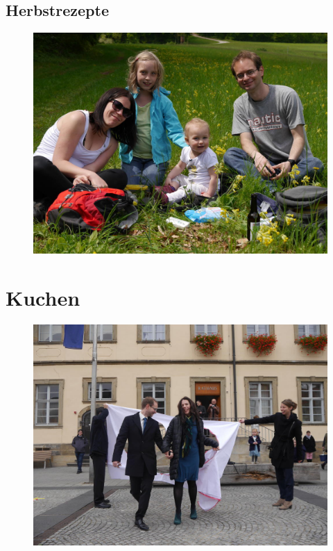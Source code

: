 \documentclass[%
a4paper,
twoside,
12pt
]{article}
\begin{document}
\begin{otherlanguage}{ngerman}
\subsection{Herbstrezepte}
\begin{figure}[h]
	\includegraphics[width=\textwidth]{pic/US}
\end{figure}











\cleardoublepage
\section{Kuchen}
\begin{figure}[h]
	\includegraphics[width=\textwidth]{pic/kuchen.jpg}
\end{figure}



\end{otherlanguage}
\end{document}
